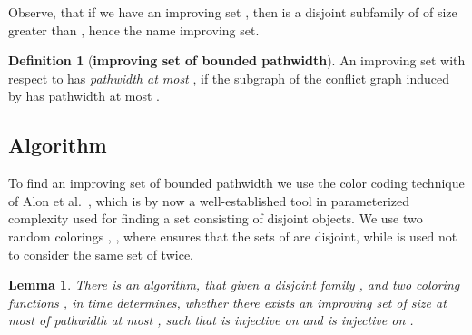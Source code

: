 \documentclass[11pt]{article}
\newtheorem{lemma}[theorem]{Lemma}
\theoremstyle{definition}
\newtheorem{definition}[theorem]{Definition}
\begin{document}
Observe, that if we have an improving set , then 
is a disjoint subfamily of  of size greater than , hence the name improving set.

\begin{definition}[{\bf improving set of bounded pathwidth}]
An improving set  with respect to  has {\em pathwidth at most },
if the subgraph of the conflict graph  induced by  has pathwidth at most .
\end{definition}

\subsection{Algorithm}
\label{ssec:algorithm}

To find an improving set of bounded pathwidth we use
the color coding technique of Alon et al.~\cite{color-coding},
which is by now a well-established tool in parameterized complexity
used for finding a set consisting of disjoint objects.
We use two random colorings , ,
where  ensures that the sets of  are disjoint,
while  is used not to consider the same set of  twice.

\begin{lemma}
\label{lem:search}
There is an algorithm, that given a disjoint family ,
and two coloring functions , 
in  time determines, whether there exists an improving 
set  of size at most 
of pathwidth at most , such that  is injective on  
and  is injective on .
\end{lemma}
\end{document}
